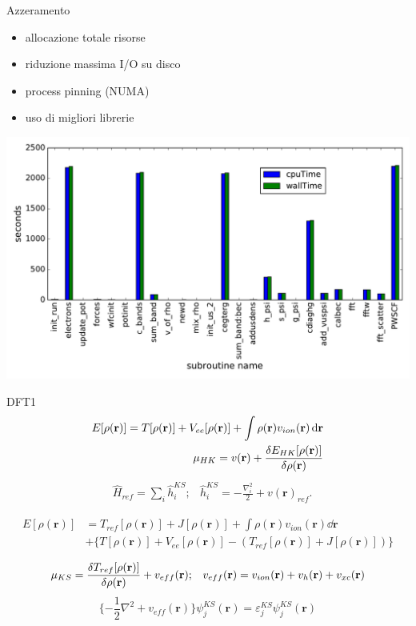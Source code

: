 \documentclass[8pt]{beamer}
\newcommand\dens{\rho(\mathbf{r})}
\newcommand\erre{\mathbf{r}}
\begin{document}
\begin{frame}{Azzeramento}
\begin{itemize}
	\item allocazione totale risorse
	\item riduzione massima I/O su disco
	\item process pinning (NUMA)
	\item uso di migliori librerie
\end{itemize}
\begin{center}
	\includegraphics[height=0.5\textheight]{cpuwalltime.pdf}	
\end{center}
\end{frame}


\begin{frame}{DFT1}
	\begin{align}
		E[\dens] = T[\dens] + V_{ee}[\dens] + \int \dens v_{ion}(\erre) \dd{\erre} \\
			\mu_{HK} = v(\erre) + \frac{\var{E_{HK}[\dens]}}{\var{\dens}}
	\end{align}
	\begin{align}
&\hat{H}_{ref} = \sum_{i} \hat{h}_i^{KS} ;
&\hat{h}_i^{KS} = - \frac{\nabla^{2}_{i}}{2} + v(\erre)_{ref} .
\end{align}

\begin{align}
		E[\dens] &= 	T_{ref}[\dens] + J[\dens] + \int \dens v_{ion}(\erre) \dd{\erre}\\
			 &+ \lbrace
			 	T[\dens] + V_{ee}[\dens] - 
			 	\left( 
			 		T_{ref}[\dens] + J[\dens] 
			 	\right)
			 \rbrace
\end{align}
	
\begin{align}
	&\mu_{KS} = \frac{\var{T_{ref}[\dens]}}{\var{\dens}}  + v_{eff}(\erre); &v_{eff}(\erre) = v_{ion}(\erre) + v_{h}(\erre) + v_{xc}(\erre)
\end{align}
\begin{equation}
 \lbrace  - \frac{1}{2} \nabla^2+ v_{eff}(\erre) \rbrace 	\psi_{j}^{KS}(\erre) = \varepsilon_{j}^{KS} 	\psi_{j}^{KS}(\erre)
\end{equation}
\end{frame}
\end{document}

